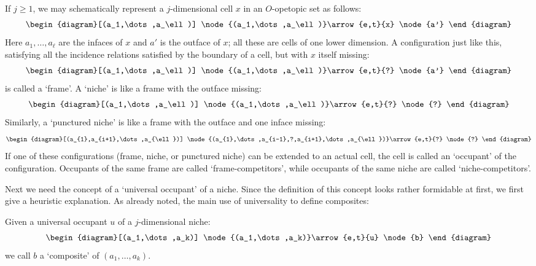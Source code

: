 If $j \ge 1$, we may schematically represent a $j$-dimensional
cell $x$ in an $O$-opetopic set as follows:
\[ 
\begin{diagram}[(a_1,\dots,a_\ell)]
\node{(a_1,\dots,a_\ell)}\arrow{e,t}{x} \node{a'}
\end{diagram} 
\]
Here $a_1,\dots,a_\ell$ are the infaces of $x$ and $a'$ is the outface
of $x$; all these are cells of one lower dimension.   A configuration
just like this, satisfying all the incidence relations satisfied by the
boundary of a cell, but with $x$ itself missing:
\[
\begin{diagram}[(a_1,\dots,a_\ell)]
\node{(a_1,\dots,a_\ell)}\arrow{e,t}{?} \node{a'}
\end{diagram}
\] 
is called a `frame'.  A `niche' is like a frame with the outface missing:
\[ 
\begin{diagram}[(a_1,\dots,a_\ell)]
\node{(a_1,\dots,a_\ell)}\arrow{e,t}{?} \node{?}
\end{diagram} 
\]
Similarly, a `punctured niche' is like a frame with the outface
and one inface missing:
\[ 
\begin{diagram}[(a_{1},a_{i+1},\dots,a_{\ell})]
\node{(a_{1},\dots,a_{i-1},?,a_{i+1},\dots,a_{\ell})}\arrow{e,t}{?} \node{?}
\end{diagram} 
\]
If one of these configurations (frame, niche, or punctured niche) can be
extended to an actual cell, the cell is called an `occupant' of the
configuration.  Occupants of the same frame are called
`frame-competitors', while occupants of the same niche are called
`niche-competitors'.  

Next we need the concept of a `universal occupant' of a niche.  Since
the definition of this concept looks rather formidable at first, we
first give a heuristic explanation.  As already noted, the main use
of universality to define composites:

\begin{defn}\et  Given a universal occupant $u$ of a $j$-dimensional niche:
\[
\begin{diagram}[(a_1,\dots,a_k)]
\node{(a_1,\dots,a_k)}\arrow{e,t}{u} \node{b}
\end{diagram}
\]
we call $b$ a `composite' of $(a_{1},\dots,a_{k})$.
\end{defn}

